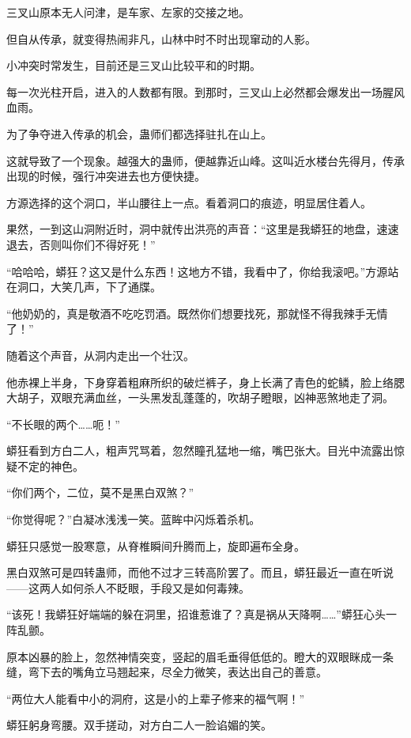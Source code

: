 
\begin{this_body}

三叉山原本无人问津，是车家、左家的交接之地。

但自从传承，就变得热闹非凡，山林中时不时出现窜动的人影。

小冲突时常发生，目前还是三叉山比较平和的时期。

每一次光柱开启，进入的人数都有限。到那时，三叉山上必然都会爆发出一场腥风血雨。

为了争夺进入传承的机会，蛊师们都选择驻扎在山上。

这就导致了一个现象。越强大的蛊师，便越靠近山峰。这叫近水楼台先得月，传承出现的时候，强行冲突进去也方便快捷。

方源选择的这个洞口，半山腰往上一点。看着洞口的痕迹，明显居住着人。

果然，一到这山洞附近时，洞中就传出洪亮的声音：“这里是我蟒狂的地盘，速速退去，否则叫你们不得好死！”

“哈哈哈，蟒狂？这又是什么东西！这地方不错，我看中了，你给我滚吧。”方源站在洞口，大笑几声，下了通牒。

“他奶奶的，真是敬酒不吃吃罚酒。既然你们想要找死，那就怪不得我辣手无情了！”

随着这个声音，从洞内走出一个壮汉。

他赤裸上半身，下身穿着粗麻所织的破烂裤子，身上长满了青色的蛇鳞，脸上络腮大胡子，双眼充满血丝，一头黑发乱蓬蓬的，吹胡子瞪眼，凶神恶煞地走了洞。

“不长眼的两个……呃！”

蟒狂看到方白二人，粗声咒骂着，忽然瞳孔猛地一缩，嘴巴张大。目光中流露出惊疑不定的神色。

“你们两个，二位，莫不是黑白双煞？”

“你觉得呢？”白凝冰浅浅一笑。蓝眸中闪烁着杀机。

蟒狂只感觉一股寒意，从脊椎瞬间升腾而上，旋即遍布全身。

黑白双煞可是四转蛊师，而他不过才三转高阶罢了。而且，蟒狂最近一直在听说——这两人如何杀人不眨眼，手段又是如何毒辣。

“该死！我蟒狂好端端的躲在洞里，招谁惹谁了？真是祸从天降啊……”蟒狂心头一阵乱颤。

原本凶暴的脸上，忽然神情突变，竖起的眉毛垂得低低的。瞪大的双眼眯成一条缝，弯下去的嘴角立马翘起来，尽全力微笑，表达出自己的善意。

“两位大人能看中小的洞府，这是小的上辈子修来的福气啊！”

蟒狂躬身弯腰。双手搓动，对方白二人一脸谄媚的笑。


\end{this_body}
